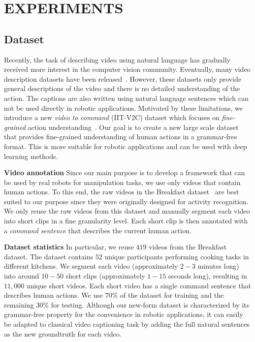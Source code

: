 \section{EXPERIMENTS} \label{Sec:exp}
\subsection{Dataset}

Recently, the task of describing video using natural language has gradually received more interest in the computer vision community. Eventually, many video description datasets have been released~\cite{Xu16_MSR_Dataset}. However, these datasets only provide general descriptions of the video and there is no detailed understanding of the action. The captions are also written using natural language sentences which can not be used directly in robotic applications. Motivated by these limitations, we introduce a new \textit{video to command} (IIT-V2C) dataset which focuses on \textit{fine-grained} action understanding~\cite{lea2016learning}. Our goal is to create a new large scale dataset that provides fine-grained understanding of human actions in a grammar-free format. This is more suitable for robotic applications and can be used with deep learning methods.

\textbf{Video annotation} 
Since our main purpose is to develop a framework that can be used by real robots for manipulation tasks, we use only videos that contain human actions. To this end, the raw videos in the Breakfast dataset~\cite{Kuehne14_BF_Dataset} are best suited to our purpose since they were originally designed for activity recognition. We only reuse the raw videos from this dataset and manually segment each video into short clips in a fine granularity level. Each short clip is then annotated with a \textit{command sentence} that describes the current human action.

\textbf{Dataset statistics} 
In particular, we reuse $419$ videos from the Breakfast dataset. The dataset contains $52$ unique participants performing cooking tasks in different kitchens. We segment each video (approximately $2-3$ minutes long) into around $10-50$ short clips (approximately $1-15$ seconds long), resulting in $11,000$ unique short videos. Each short video has a single command sentence that describes human actions. We use $70\%$ of the dataset for training and the remaining $30\%$ for testing. Although our new-form dataset is characterized by its grammar-free property for the convenience in robotic applications, it can easily be adapted to classical video captioning task by adding the full natural sentences as the new groundtruth for each video.


